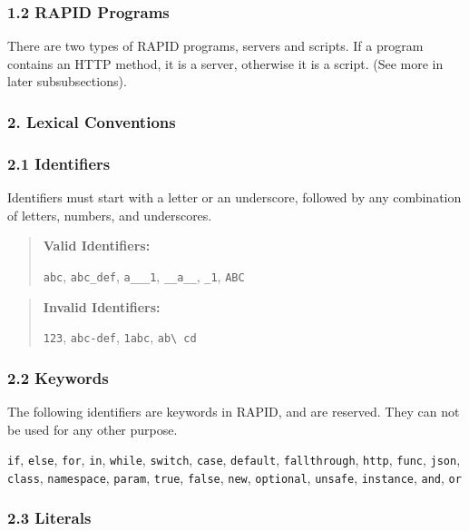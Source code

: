 \subsubsection{1.2 RAPID Programs}\label{rapid-programs}

There are two types of RAPID programs, servers and scripts. If a program
contains an HTTP method, it is a server, otherwise it is a script. (See
more in later subsubsections).

\subsubsection{2. Lexical Conventions}\label{lexical-conventions}

\subsubsection{2.1 Identifiers}\label{identifiers}

Identifiers must start with a letter or an underscore, followed by any
combination of letters, numbers, and underscores.

\begin{quote}
\textbf{Valid Identifiers:}

\texttt{abc}, \texttt{abc\_def}, \texttt{a\_\_\_1}, \texttt{\_\_a\_\_},
\texttt{\_1}, \texttt{ABC}
\end{quote}

\begin{quote}
\textbf{Invalid Identifiers:}

\texttt{123}, \texttt{abc-def}, \texttt{1abc},
\texttt{ab\textbackslash{} cd}
\end{quote}

\subsubsection{2.2 Keywords}\label{keywords}

The following identifiers are keywords in RAPID, and are reserved. They
can not be used for any other purpose.

\texttt{if}, \texttt{else}, \texttt{for}, \texttt{in}, \texttt{while},
\texttt{switch}, \texttt{case}, \texttt{default}, \texttt{fallthrough},
\texttt{http}, \texttt{func}, \texttt{json}, \texttt{class},
\texttt{namespace}, \texttt{param}, \texttt{true}, \texttt{false},
\texttt{new}, \texttt{optional}, \texttt{unsafe}, \texttt{instance},
\texttt{and}, \texttt{or}

\subsubsection{2.3 Literals}\label{literals}

